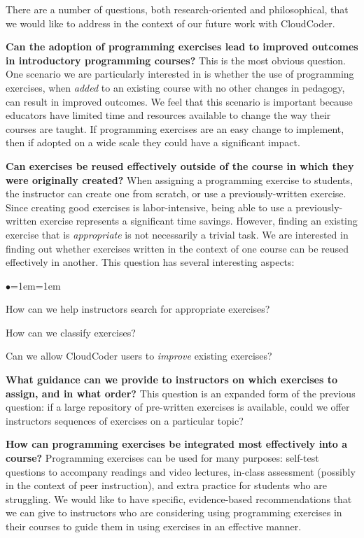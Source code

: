 \documentclass{sig-alternate}
\newenvironment{denseItemize}{%
\begin{list}{$\bullet$}{\setlength{\itemsep}{0in}\setlength{\parsep}{0in}\leftmargin=1em\labelwidth=1em}}{\end{list}}
\begin{document}
There are a number of questions, both research-oriented and philosophical,
that we would like to address in the context of our future work with CloudCoder.

{\bf Can the adoption of programming exercises lead to improved outcomes
in introductory programming courses?}  This is the most obvious
question.  One scenario we are particularly interested in is whether
the use of programming exercises, when {\em added} to an existing course with
no other changes in pedagogy, can result in improved outcomes.  We feel
that this scenario is important because educators have limited time
and resources available to change the way their courses are taught.
If programming exercises are an easy change to implement, then
if adopted on a wide scale they could have a significant impact.

{\bf Can exercises be reused effectively outside of the course in which
they were originally created?}  When assigning a programming exercise to
students, the instructor can create one from scratch, or use a
previously-written exercise.  Since creating good exercises is labor-intensive,
being able to use a previously-written exercise represents a significant
time savings.  However, finding an existing exercise that is {\em appropriate}
is not necessarily a trivial task.  We are interested in finding
out whether exercises written in the context of one course can be reused
effectively in another.
This question has several interesting aspects:

\begin{denseItemize}
\item How can we help instructors search for appropriate exercises?
\item How can we classify exercises?
\item Can we allow CloudCoder users to {\em improve} existing exercises?
\end{denseItemize}

{\bf What guidance can we provide to instructors on which exercises to assign,
and in what order?}  This question is an expanded form of the previous question:
if a large repository of pre-written exercises is available,
could we offer instructors sequences of exercises on a particular topic?

{\bf How can programming exercises be integrated most effectively into a course?}
Programming exercises can be used for many purposes: self-test questions
to accompany readings and video lectures, in-class assessment (possibly
in the context of peer instruction), and extra practice for students who
are struggling.  We would like to have specific, evidence-based recommendations
that we can give to instructors who are considering using programming
exercises in their courses to guide them in using exercises in an effective manner.
\end{document}
